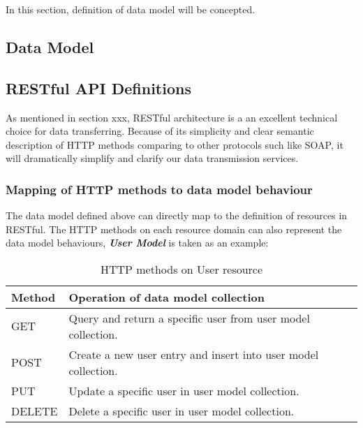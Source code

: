 

In this section, definition of data model will be concepted. 


\subsection{Data Model}





\subsection{RESTful API Definitions}

As mentioned in section xxx, RESTful architecture is a an excellent technical choice for data transferring. Because of its simplicity and clear semantic description of HTTP methods comparing to other protocols such like SOAP, it will dramatically simplify and clarify our data transmission services. 

\subsubsection{ Mapping of HTTP methods to data model behaviour }
The data model defined above can directly map to the definition of resources in RESTful. The HTTP methods on each resource domain can also represent the data model behaviours, \textbf{\textit{User Model}} is taken as an example: 
\begin{table}[!htbp]
\centering
\begin{tabularx}{\textwidth}{@{}lX@{}}
\toprule
Method        & {Operation of data model collection }                            \\ \midrule
GET           & {Query and return a specific user from user model collection.}   \\
POST          & {Create a new user entry and insert into user model collection.} \\
PUT           & {Update a specific user in user model collection.}               \\
DELETE        & {Delete a specific user in user model collection.}               \\ \bottomrule
\end{tabularx}
\caption{HTTP methods on User resource}
\label{http-method-on-user-resource}
\end{table}

